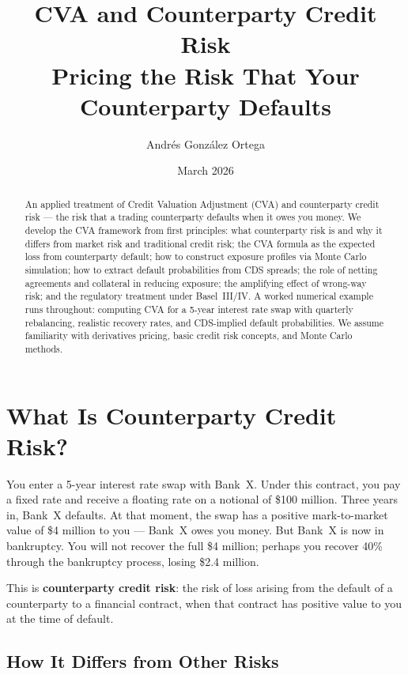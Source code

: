 \documentclass[11pt, a4paper]{article}
\title{%
    \textbf{CVA and Counterparty Credit Risk} \\[0.5em]
    \large Pricing the Risk That Your Counterparty Defaults
}
\author{Andr\'es Gonz\'alez Ortega}
\date{March 2026}
\theoremstyle{definition}
\theoremstyle{plain}
\theoremstyle{remark}
\begin{document}
\maketitle

\begin{abstract}
An applied treatment of Credit Valuation Adjustment (CVA) and counterparty credit risk ---
the risk that a trading counterparty defaults when it owes you money.
We develop the CVA framework from first principles: what counterparty risk is and why it
differs from market risk and traditional credit risk; the CVA formula as the expected loss
from counterparty default; how to construct exposure profiles via Monte Carlo simulation;
how to extract default probabilities from CDS spreads; the role of netting agreements and
collateral in reducing exposure; the amplifying effect of wrong-way risk; and the regulatory
treatment under Basel~III/IV.
A worked numerical example runs throughout: computing CVA for a 5-year interest rate swap
with quarterly rebalancing, realistic recovery rates, and CDS-implied default probabilities.
We assume familiarity with derivatives pricing, basic credit risk concepts, and Monte Carlo methods.
\end{abstract}

\tableofcontents
\newpage

\section{What Is Counterparty Credit Risk?}
\label{sec:counterparty-risk}

You enter a 5-year interest rate swap with Bank~X\@.
Under this contract, you pay a fixed rate and receive a floating rate on a notional
of \$100 million.
Three years in, Bank~X defaults.
At that moment, the swap has a positive mark-to-market value of \$4 million to you ---
Bank~X owes you money.
But Bank~X is now in bankruptcy.
You will not recover the full \$4 million; perhaps you recover 40\% through the
bankruptcy process, losing \$2.4 million.

This is \textbf{counterparty credit risk}: the risk of loss arising from the default
of a counterparty to a financial contract, when that contract has positive value to you
at the time of default.

\subsection{How It Differs from Other Risks}
\end{document}
